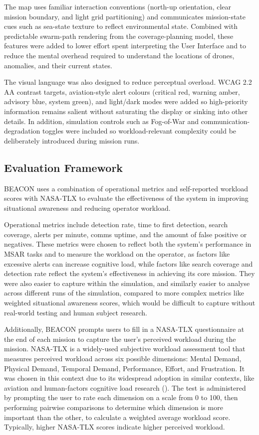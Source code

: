 The map uses familiar interaction conventions (north-up orientation, clear mission boundary, and light grid partitioning) and communicates mission-state cues such as sea-state texture to reflect environmental state.
Combined with predictable swarm-path rendering from the coverage-planning model, these features were added to lower effort spent interpreting the User Interface and to reduce the mental overhead required to understand the locations of drones, anomalies, and their current states.

The visual language was also designed to reduce perceptual overload.
WCAG 2.2 AA contrast targets, aviation-style alert colours (critical red, warning amber, advisory blue, system green), and light/dark modes were added so high-priority information remains salient without saturating the display or sinking into other details.
In addition, simulation controls such as Fog-of-War and communication-degradation toggles were included so workload-relevant complexity could be deliberately introduced during mission runs.

\subsection{Evaluation Framework}\label{subsec:evaluation-framework}

BEACON uses a combination of operational metrics and self-reported workload scores with NASA-TLX to evaluate the effectiveness of the system in improving situational awareness and reducing operator workload.

Operational metrics include detection rate, time to first detection, search coverage, alerts per minute, comms uptime, and the amount of false positive or negatives.
These metrics were chosen to reflect both the system's performance in MSAR tasks and to measure the workload on the operator, as factors like excessive alerts can increase cognitive load, while factors like search coverage and detection rate reflect the system's effectiveness in achieving its core mission.
They were also easier to capture within the simulation, and similarly easier to analyse across different runs of the simulation, compared to more complex metrics like weighted situational awareness scores, which would be difficult to capture without real-world testing and human subject research.

Additionally, BEACON prompts users to fill in a NASA-TLX questionnaire at the end of each mission to capture the user's perceived workload during the mission.
NASA-TLX is a widely-used subjective workload assessment tool that measures perceived workload across six possible dimensions: Mental Demand, Physical Demand, Temporal Demand, Performance, Effort, and Frustration.
It was chosen in this context due to its widespread adoption in similar contexts, like aviation and human-factors cognitive load research (\cite{COLLIGAN2015469})\@.
The test is administered by prompting the user to rate each dimension on a scale from 0 to 100, then performing pairwise comparisons to determine which dimension is more important than the other, to calculate a weighted average workload score.
Typically, higher NASA-TLX scores indicate higher perceived workload.


